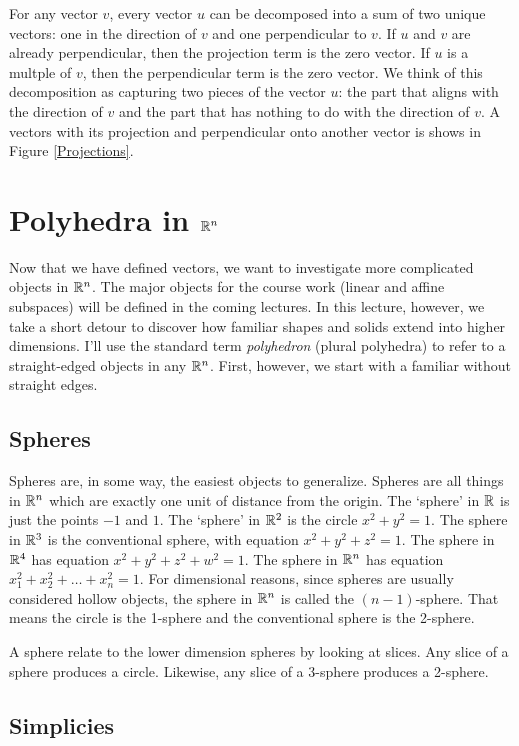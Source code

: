 \documentclass[fleqn]{report}
\begin{document}
For any vector $v$, every vector $u$ can be decomposed into a
sum of two unique vectors: one in the direction of $v$ and one
perpendicular to $v$. If $u$ and $v$ are already
perpendicular, then the projection term is the zero vector. If
$u$ is a multple of $v$, then the perpendicular term is the
zero vector. We think of this decomposition as capturing two
pieces of the vector $u$: the part that aligns with the
direction of $v$ and the part that has nothing to do with the
direction of $v$. A vectors with its projection and
perpendicular onto another vector is shows in Figure
\ref{Projections}. 

\chapter{Polyhedra in $\mathbb{R}^n$}

Now that we have defined vectors, we want to investigate
more complicated objects in $\mathbb{R}^n$. The major objects for the
course work (linear and affine subspaces) will be defined in
the coming lectures. In this lecture, however, we take a short
detour to discover how familiar shapes and solids extend into
higher dimensions. I'll use the standard term
\emph{polyhedron} (plural polyhedra) to refer to a
straight-edged objects in any $\mathbb{R}^n$. First, however, we
start with a familiar without straight edges.

\section{Spheres}

Spheres are, in some way, the easiest objects to generalize.
Spheres are all things in $\mathbb{R}^n$ which are exactly one unit
of distance from the origin. The `sphere' in $\mathbb{R}$ is just
the points $-1$ and $1$. The `sphere' in $\mathbb{R}^2$ is the circle
$x^2 + y^2 = 1$. The sphere in $\mathbb{R}^3$ is the conventional
sphere, with equation $x^2 + y^2 + z^2 = 1$. The sphere in
$\mathbb{R}^4$ has equation $x^2 + y^2 + z^2 + w^2 = 1$. The sphere
in $\mathbb{R}^n$ has equation $x_1^2 + x_2^2 + \ldots + x_n^2 = 1$.
For dimensional reasons, since spheres are usually
considered hollow objects, the sphere in $\mathbb{R}^n$ is
called the $(n-1)$-sphere. That means the circle is the
1-sphere and the conventional sphere is the 2-sphere.

A sphere relate to the lower dimension spheres by looking at
slices. Any slice of a sphere produces a circle. Likewise, any
slice of a 3-sphere produces a 2-sphere.
\clearpage

\section{Simplicies}
\end{document}

